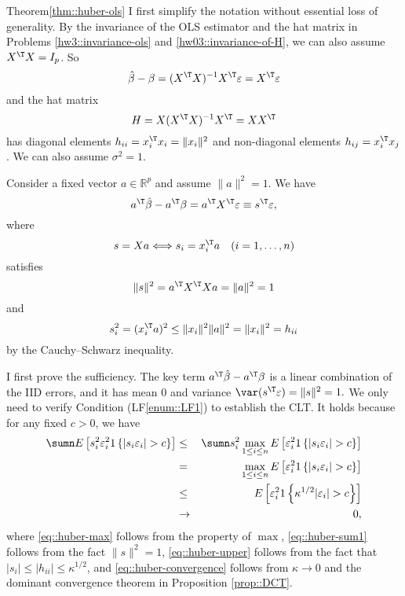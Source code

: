 \begin{myproof}{Theorem}{\ref{thm::huber-ols}}
I first simplify the notation without essential loss of generality. 
By the invariance of the OLS estimator and the hat matrix in Problems \ref{hw3::invariance-ols} and \ref{hw03::invariance-of-H}, we can also assume $X^{\T} X = I_p$. So
$$
\hat{\beta} - \beta = (X^{\T} X)^{-1} X^{\T} \varepsilon = X^{\T} \varepsilon
$$
and the hat matrix 
$$
H = X (X^{\T} X)^{-1} X^{\T} = X  X^{\T}
$$
has diagonal elements $h_{ii} = x_i^{\T} x_i = \|x_i \|^2$ and non-diagonal elements $h_{ij} =x_i^{\T} x_j  $. We can also assume $\sigma^2 = 1$. 

Consider a fixed vector $a \in \mathbb{R}^p$ and assume $\|a\|^2 = 1$. 
We have
$$
a^{\T}  \hat{\beta} - a^{\T}  \beta = a^{\T}  X^{\T} \varepsilon \equiv s^{\T} \varepsilon, 
$$
where 
$$
s = X a  \Longleftrightarrow   s_i = x_i^{\T} a \quad (i=1,\ldots, n)
$$ 
satisfies 
$$
\| s \|^2 = a^{\T}  X^{\T}  X a = \|a\|^2 = 1
$$ 
and 
$$
s_i^2 = (x_i^{\T} a)^2 \leq \| x_i\|^2 \| a \|^2 = \| x_i\|^2 = h_{ii}
$$
by the Cauchy--Schwarz inequality. 


I first prove the sufficiency. 
The key term $a^{\T}  \hat{\beta} - a^{\T}  \beta$ is a linear combination of the IID errors, and it has mean $0$ and variance 
$
\var( s^{\T} \varepsilon ) = \| s \|^2 =1.
$
We only need to verify Condition (LF\ref{enum::LF1}) to establish the CLT. It holds because for any fixed $c>0$, we have 
\begin{eqnarray} 
 \sumn E\left[   s_i^2 \varepsilon_i^2 1\left\{    |s_i  \varepsilon_i |  > c \right\}  \right] 
&\leq &  \sumn  s_i^2 \max_{1\leq i \leq  n } E\left[   \varepsilon_i^2 1\left\{    |s_i  \varepsilon_i |  > c \right\}  \right]   \label{eq::huber-max} \\
&=&   \max_{1\leq i \leq  n } E\left[   \varepsilon_i^2 1\left\{    |s_i  \varepsilon_i |  > c \right\}  \right]  \label{eq::huber-sum1} \\
&\leq &   E\left[   \varepsilon_i^2 1\left\{  \kappa^{1/2}    |  \varepsilon_i |  > c \right\}  \right]  \label{eq::huber-upper} \\
&\rightarrow & 0, \label{eq::huber-convergence}
\end{eqnarray}  
where \eqref{eq::huber-max} follows from the property of $\max$, \eqref{eq::huber-sum1} follows from the fact $\| s \|^2 =1$, \eqref{eq::huber-upper} follows from the fact that $ |s_i| \leq | h_{ii} |  \leq \kappa^{1/2}$, and \eqref{eq::huber-convergence} follows from $\kappa \rightarrow 0$ and the dominant convergence theorem in Proposition \ref{prop::DCT}.



\end{myproof}
